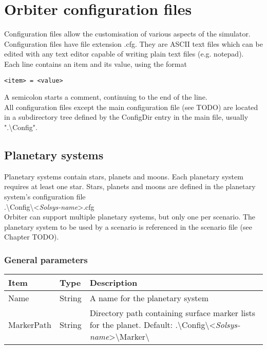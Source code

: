 \documentclass[Orbiter Developer Manual.tex]{subfiles}
\begin{document}
\section{Orbiter configuration files}
Configuration files allow the customisation of various aspects of the simulator. Configuration files have file extension .cfg. They are ASCII text files which can be edited with any text editor capable of writing plain text files (e.g. notepad).\\
Each line contains an item and its value, using the format

\begin{lstlisting}[language=OSFS]
<item> = <value>
\end{lstlisting}

\noindent
A semicolon starts a comment, continuing to the end of the line.\\
All configuration files except the main configuration file (see TODO) are located in a subdirectory tree defined by the ConfigDir entry in the main file, usually ".\textbackslash Config".

\subsection{Planetary systems}
Planetary systems contain stars, planets and moons. Each planetary system requires at least one star. Stars, planets and moons are defined in the planetary system’s configuration file\\
.\textbackslash Config\textbackslash <\textit{Solsys-name}>.cfg\\
Orbiter can support multiple planetary systems, but only one per scenario. The planetary system to be used by a scenario is referenced in the scenario file (see Chapter TODO).

\subsubsection*{General parameters}

	\begin{longtable}{ |p{}|p{}|p{}| }
	\hline\rule{0pt}{2ex}
	\textbf{Item} & \textbf{Type} & \textbf{Description}\\
	\hline\rule{0pt}{2ex}
	Name & String & A name for the planetary system\\
	\hline\rule{0pt}{2ex}
	MarkerPath & String & Directory path containing surface marker lists for the planet. Default: .\textbackslash Config\textbackslash <\textit{Solsys-name}>\textbackslash Marker\textbackslash \\
	\hline
	\end{longtable}
\end{document}
